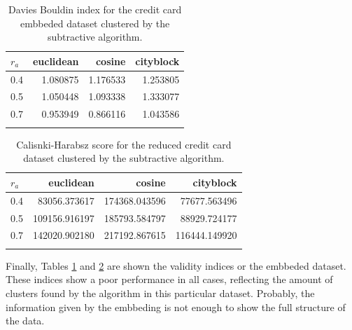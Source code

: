     \begin{table}[ht!]
        \centering
        \begin{tabular}{lrrr}
        \toprule
        $r_a$ &  euclidean &    cosine &  cityblock \\
        \midrule
        0.4 &   1.080875 &  1.176533 &   1.253805 \\
        0.5 &   1.050448 &  1.093338 &   1.333077 \\
        0.7 &   0.953949 &  0.866116 &   1.043586 \\
        \bottomrule \\
        \end{tabular}
        \caption{Davies Bouldin index for the credit card embbeded dataset clustered by the subtractive algorithm.}
        \label{tab:ce_db_s}
    \end{table}
    
    \begin{table}[ht!]
        \centering
        \begin{tabular}{lrrr}
        \toprule
        $r_a$ &      euclidean &         cosine &      cityblock \\
        \midrule
        0.4 &   83056.373617 &  174368.043596 &   77677.563496 \\
        0.5 &  109156.916197 &  185793.584797 &   88929.724177 \\
        0.7 &  142020.902180 &  217192.867615 &  116444.149920 \\
        \bottomrule \\
        \end{tabular}
        \caption{Calisnki-Harabsz score for the reduced credit card dataset clustered by the subtractive algorithm.}
        \label{tab:ce_ch_s}
    \end{table}
    
    Finally, Tables \ref{tab:ce_db_s} and \ref{tab:ce_ch_s} are shown the validity indices or the embbeded dataset. These indices show a poor performance in all cases, reflecting the amount of clusters found by the algorithm in this particular dataset. Probably, the information given by the embbeding is not enough to show the full structure of the data.
    

